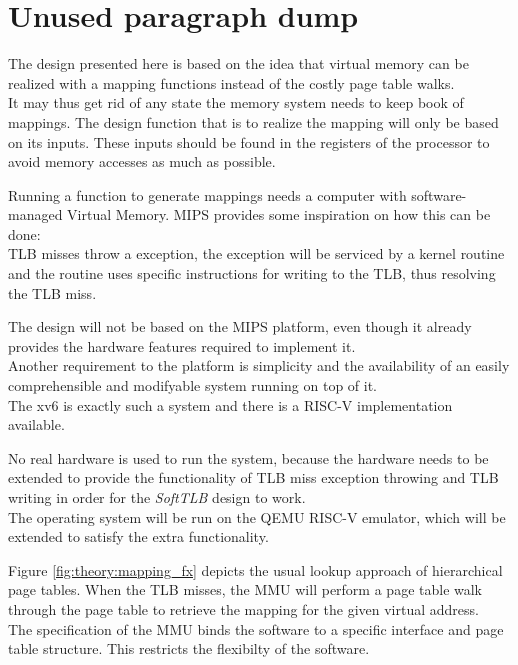 
\chapter{Unused paragraph dump}
\label{appendixa}


The design presented here is based on the idea that virtual memory can be realized with a
mapping functions instead of the costly page table walks.\\
It may thus get rid of any state the memory system needs to keep book of mappings. The design
function that is to realize the mapping will only be based on its inputs. These inputs
should be found in the registers of the processor to avoid memory accesses as much as possible.

Running a function to generate mappings needs a computer with software-managed Virtual Memory.
MIPS provides some inspiration on how this can be done:\\
TLB misses throw a exception, the exception will be serviced by a kernel routine and the routine
uses specific instructions for writing to the TLB, thus resolving the TLB miss.


The design will not be based on the MIPS platform, even though it already provides the hardware
features required to implement it.\\
Another requirement to the platform is simplicity and the availability of an easily comprehensible
and modifyable system running on top of it.\\
The xv6 is exactly such a system and there is a RISC-V implementation available.

No real hardware is used to run the system, because the hardware needs to be extended to provide
the functionality of TLB miss exception throwing and TLB writing in order for the \emph{SoftTLB}
design to work.\\
The operating system will be run on the QEMU RISC-V emulator, which will be extended to satisfy
the extra functionality.


Figure \ref{fig:theory:mapping_fx} depicts the usual lookup approach of hierarchical page tables.
When the TLB misses, the MMU will perform a page table walk through the page table to retrieve the mapping
for the given virtual address.\\

The specification of the MMU binds the software to a specific interface and page table structure. This restricts
the flexibilty of the software.

